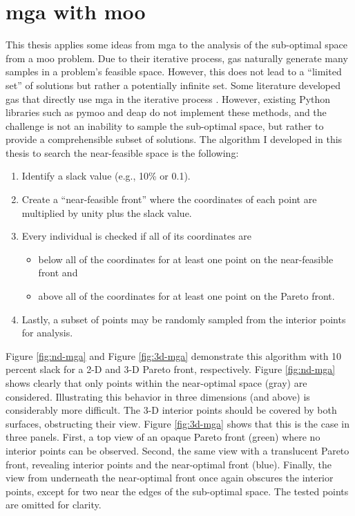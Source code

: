 \section{\acs{mga} with \acl{moo}}
\label{section:mga-moo}

This thesis applies some ideas from \ac{mga} to the analysis of the
sub-optimal space from a \acl{moo} problem. Due to their iterative process, 
\acp{ga} naturally generate many samples in a problem's feasible space. However, this does not lead to a ``limited set'' of solutions but rather a potentially infinite set. Some literature developed \acp{ga} that directly use \ac{mga} in the iterative process \cite{zechman_evolutionary_2004,zechman_evolutionary_2013}. However, existing Python libraries such as \ac{pymoo} and \ac{deap} do not implement these methods, and the challenge
is not an inability to sample the sub-optimal space, but rather to provide a comprehensible
subset of solutions. The algorithm I developed in this thesis to search the near-feasible space is the following:

\begin{enumerate}
    \item Identify a slack value (e.g., 10\% or 0.1). 
    \item Create a ``near-feasible front'' where the coordinates of each point are multiplied by unity plus the slack value.
    \item Every individual is checked if all of its coordinates are
    \begin{itemize}
        \item below all of the coordinates for at least one point on the near-feasible front
        and
        \item above all of the coordinates for at least one point on the Pareto front.
    \end{itemize}  
    \item Lastly, a subset of points may be randomly sampled from the interior points for analysis.
\end{enumerate}
\noindent
Figure \ref{fig:nd-mga} and Figure \ref{fig:3d-mga} demonstrate this 
algorithm with 10 percent slack for a 2-D and 3-D Pareto front, 
respectively. Figure \ref{fig:nd-mga} shows clearly that only points 
within the near-optimal space (gray) are considered. Illustrating this
behavior in three dimensions (and above) is considerably more 
difficult. The 3-D interior points should be covered by both surfaces,
obstructing their view. Figure \ref{fig:3d-mga} shows that this is the
case in three panels. First, a top view of an opaque Pareto front 
(green) where no interior points can be observed. Second, the same 
view with a translucent Pareto front, revealing interior points and 
the near-optimal front (blue). Finally, the view from underneath the 
near-optimal front once again obscures the interior points, except 
for two near the edges of the sub-optimal space. The tested points are
omitted for clarity.
 

